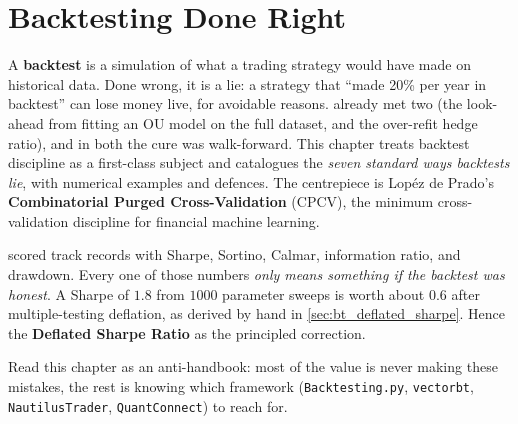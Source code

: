 \chapter{Backtesting Done Right}
\label{ch:backtesting}

A \textbf{backtest} is a simulation of what a trading strategy would
have made on historical data. Done wrong, it is a lie: a strategy
that ``made 20\% per year in backtest'' can lose money live, for
avoidable reasons. 
already met two (the look-ahead from fitting an OU model on the
full dataset, and the over-refit hedge ratio), and in both the
cure was walk-forward. This chapter treats backtest discipline as a
first-class subject and catalogues the \emph{seven standard ways
backtests lie}, with numerical examples and defences. The centrepiece
is Lop\'ez de Prado's \textbf{Combinatorial Purged Cross-Validation}
(CPCV), the minimum cross-validation discipline for financial machine
learning.

 scored track records with Sharpe, Sortino,
Calmar, information ratio, and drawdown. Every one of those numbers
\emph{only means something if the backtest was honest}. A Sharpe of
$1.8$ from $1000$ parameter sweeps is worth about $0.6$ after
multiple-testing deflation, as derived by hand in
\cref{sec:bt_deflated_sharpe}. Hence the \textbf{Deflated Sharpe
Ratio} \citeAFML{} as the principled correction.

Read this chapter as an anti-handbook: most of the value is never
making these mistakes, the rest is knowing which framework
(\texttt{Backtesting.py}, \texttt{vectorbt}, \texttt{NautilusTrader},
\texttt{QuantConnect}) to reach for.

